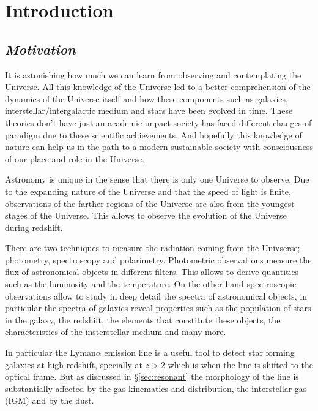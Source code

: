
\chapter{Introduction} %

\label{sec:intro} %


\section{\emph{Motivation}}

It is astonishing how much we can learn from observing and 
contemplating the Universe. All this knowledge of the Universe
led to a better comprehension of the dynamics of the Universe itself 
and how these components such as galaxies, interstellar/intergalactic
medium and stars have been evolved in time. These theories don't have
just an academic impact society has faced different changes of 
paradigm due to these scientific achievements. And hopefully this
knowledge of nature can help us in the path to a modern 
sustainable society with consciousness of our place and role 
in the Universe.  

Astronomy is unique in the sense that there is only one Universe 
to observe. Due to the expanding nature of the Universe and 
that the speed of light is finite, observations of the farther 
regions of the Universe are also from the youngest stages of the Universe.
This allows to observe the evolution of the Universe during redshift.

There are two techniques to measure the radiation coming from the 
Univserse; photometry, spectroscopy and polarimetry. Photometric observations measure 
the flux of astronomical objects in different filters. This allows to derive quantities 
such as the luminosity and the temperature. On the other hand spectroscopic observations 
allow to study in deep detail
the spectra of astronomical objects, in particular the spectra of 
galaxies reveal properties such as the population of stars in the galaxy, the
redshift, the elements that constitute these objects, the characteristics 
of the insterstellar medium and many more.

In particular the Lyman$\alpha$ emission line is a useful 
tool to detect star forming galaxies at high redshift, specially 
at $z>2$ which is when the line is shifted to the optical frame. But 
as discussed in \S\ref{sec:resonant} the morphology of the line 
is substantially affected
by the gas kinematics and distribution, the interstellar gas (IGM)
 and by the dust. 

